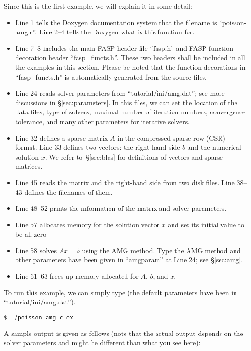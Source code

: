 \documentclass[11pt]{memoir}
\begin{document}
%
Since this is the first example, we will explain it in some detail:
\begin{itemize}
%
\item Line 1 tells the Doxygen documentation system that the filename is ``poisson-amg.c''. Line 2--4 tells the Doxygen what is this function for.
%
\item Line 7--8 includes the main FASP header file ``fasp.h'' and FASP function decoration header ``fasp\_functs.h''. These two headers shall be included in all the examples in this section. Please be noted that the function decorations in ``fasp\_functs.h'' is automatically generated from the source files.
%
\item Line 24 reads solver parameters from ``tutorial/ini/amg.dat''; see more discussions in \S\ref{sec:parameters}. In this files, we can set the location of the data files, type of solvers, maximal number of iteration numbers, convergence tolerance, and many other parameters for iterative solvers.
%
\item Line 32 defines a sparse matrix $A$ in the compressed sparse row (CSR) format. Line 33 defines two vectors: the right-hand side $b$ and the numerical solution $x$. We refer to~\S\ref{sec:blas} for definitions of vectors and sparse matrices.
%
\item Line 45 reads the matrix and the right-hand side from two disk files. Line 38--43 defines the filenames of them.
%
\item Line 48--52 prints the information of the matrix and solver parameters.
%
\item Line 57 allocates memory for the solution vector $x$ and set its initial value to be all zero.
%
\item Line 58 solves $Ax=b$ using the AMG method. Type the AMG method and other parameters have been given in ``amgparam'' at Line 24; see \S\ref{sec:amg}.
%
\item Line 61--63 frees up memory allocated for $A$, $b$, and $x$.
\end{itemize}
%
To run this example, we can simply type (the default parameters have been in ``tutorial/ini/amg.dat'').
%
\begin{lstlisting}[numbers=none]
$ ./poisson-amg-c.ex
\end{lstlisting}
%
A sample output is given as follows (note that the actual output depends on the solver parameters and might be different than what you see here):
\end{document}
